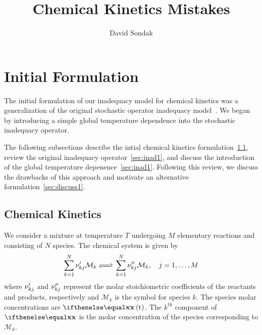 \documentclass[fontsize=12pt, %
               paper=a4, %
               hyperref]{report}
\begin{document}
\title{\textcolor{titleblue}{Chemical Kinetics Mistakes} \\[1cm]}

\author{David Sondak}
\date{} %

\maketitle %

\newpage %

\pagestyle{scrheadings} %

\section{Initial Formulation}
  The initial formulation of our inadequacy model for chemical 
  kinetics was a generalization of the original stochastic operator 
  inadequacy model~\cite{morrison2016representing}.  We began by
  introducing a simple global temperature dependence into the 
  stochastic inadequacy operator.

  The following subsections describe the intial chemical 
  kinetics formulation~\ref{sec:chemkin1}, review the original 
  inadequacy operator~\ref{sec:inad1}, and discuss the introduction 
  of the global temperature depenence~\ref{sec:inad1}.  Following 
  this review, we discuss the drawbacks of this approach and 
  motivate an alternative formulation~\ref{sec:discuss1}.
  

  \subsection{Chemical Kinetics} \label{sec:chemkin1}
  We consider a mixture at temperature $T$ undergoing $M$ elementary 
  reactions and consisting of $N$ species.  The chemical system is
  given by~\cite{kee2005chemically}
  \begin{align}
    \sum_{k=1}^{N}{\nur\mathcal{M}_{k}} \ce{<=>} 
    \sum_{k=1}^{N}{\nup\mathcal{M}_{k}}, 
    \quad j = 1,\ldots,M \label{eq:reactions}
  \end{align}
  where $\nu_{kj}^{\prime}$ and $\nu_{kj}^{\prime\prime}$ represent the molar stoichiometric 
  coefficients of the reactants and products, respectively and 
  $\mathcal{M}_{k}$ is the symbol for species $k$.  The species molar 
  concentrations are $\xc\lr{\time}$.  The $k^{\mathrm{th}}$ 
  component of $\xc$ is the molar concentration of the species 
  corresponding to $\mathcal{M}_{k}$.  
  
\end{document}
